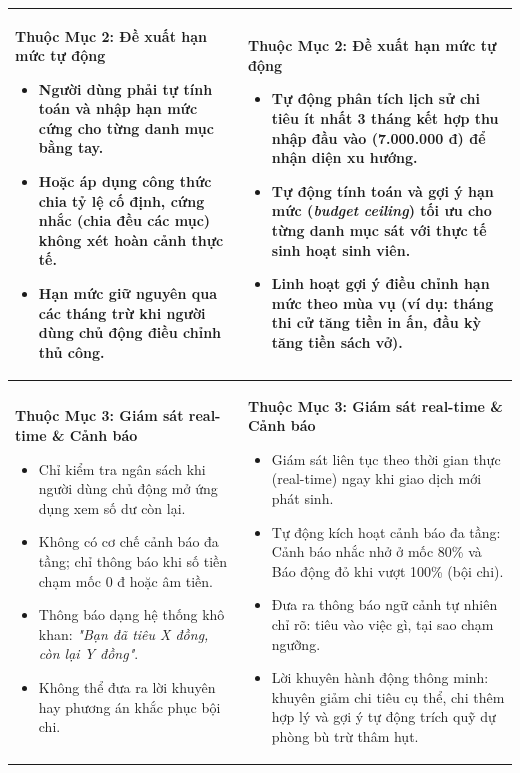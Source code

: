 \documentclass[11pt, a4paper]{article}
\begin{document}
\begin{longtable}{p{7.5cm} p{8.5cm}}
\textbf{Thuộc Mục 2: Đề xuất hạn mức tự động}
\begin{itemize}
    \item Người dùng phải tự tính toán và nhập hạn mức cứng cho từng danh mục bằng tay.
    \item Hoặc áp dụng công thức chia tỷ lệ cố định, cứng nhắc (chia đều các mục) không xét hoàn cảnh thực tế.
    \item Hạn mức giữ nguyên qua các tháng trừ khi người dùng chủ động điều chỉnh thủ công.
\end{itemize}
& 
\textbf{Thuộc Mục 2: Đề xuất hạn mức tự động}
\begin{itemize}
    \item Tự động phân tích lịch sử chi tiêu ít nhất 3 tháng kết hợp thu nhập đầu vào (7.000.000 đ) để nhận diện xu hướng.
    \item Tự động tính toán và gợi ý hạn mức (\textit{budget ceiling}) tối ưu cho từng danh mục sát với thực tế sinh hoạt sinh viên.
    \item Linh hoạt gợi ý điều chỉnh hạn mức theo mùa vụ (ví dụ: tháng thi cử tăng tiền in ấn, đầu kỳ tăng tiền sách vở).
\end{itemize} \\
\hline

\textbf{Thuộc Mục 3: Giám sát real-time \& Cảnh báo}
\begin{itemize}
    \item Chỉ kiểm tra ngân sách khi người dùng chủ động mở ứng dụng xem số dư còn lại.
    \item Không có cơ chế cảnh báo đa tầng; chỉ thông báo khi số tiền chạm mốc 0 đ hoặc âm tiền.
    \item Thông báo dạng hệ thống khô khan: \textit{"Bạn đã tiêu X đồng, còn lại Y đồng"}.
    \item Không thể đưa ra lời khuyên hay phương án khắc phục bội chi.
\end{itemize}
& 
\textbf{Thuộc Mục 3: Giám sát real-time \& Cảnh báo}
\begin{itemize}
    \item Giám sát liên tục theo thời gian thực (real-time) ngay khi giao dịch mới phát sinh.
    \item Tự động kích hoạt cảnh báo đa tầng: Cảnh báo nhắc nhở ở mốc 80\% và Báo động đỏ khi vượt 100\% (bội chi).
    \item Đưa ra thông báo ngữ cảnh tự nhiên chỉ rõ: tiêu vào việc gì, tại sao chạm ngưỡng.
    \item Lời khuyên hành động thông minh: khuyên giảm chi tiêu cụ thể, chi thêm hợp lý và gợi ý tự động trích quỹ dự phòng bù trừ thâm hụt.
\end{itemize} \\

\end{longtable}
\normalsize
\end{document}
